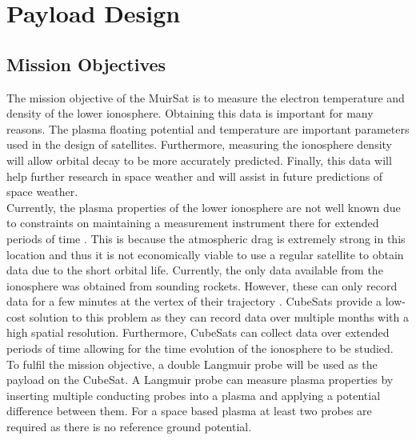\section{Payload Design}
\subsection{Mission Objectives}
The mission objective of the MuirSat is to measure the electron temperature and density of the lower ionosphere. Obtaining this data is important for many reasons. The plasma floating potential and temperature are important parameters used in the design of satellites. Furthermore, measuring the ionosphere density will allow orbital decay to be more accurately predicted. Finally, this data will help further research in space weather and will assist in future predictions of space weather.\\

Currently, the plasma properties of the lower ionosphere are not well known due to constraints on maintaining a measurement instrument there for extended periods of time \cite{na_test_2015}. This is because the atmospheric drag is extremely strong in this location and thus it is not economically viable to use a regular satellite to obtain data due to the short orbital life. Currently, the only data available from the ionosphere was obtained from sounding rockets. However, these can only record data for a few minutes at the vertex of their trajectory \cite{na_test_2015}. CubeSats provide a low-cost solution to this problem as they can record data over multiple months with a high spatial resolution. Furthermore, CubeSats can collect data over extended periods of time allowing for the time evolution of the ionosphere to be studied. To fulfil the mission objective, a double Langmuir probe will be used as the payload on the CubeSat. A Langmuir probe can measure plasma properties by inserting multiple conducting probes into a plasma and applying a potential difference between them. For a space based plasma at least two probes are required as there is no reference ground potential.\\

